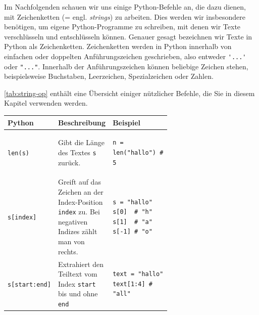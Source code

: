 Im Nachfolgenden schauen wir uns einige Python-Befehle an, die dazu dienen, mit Zeichenketten (= engl. \textit{strings}) zu arbeiten. Dies werden wir insbesondere benötigen, um eigene Python-Programme zu schreiben, mit denen wir Texte verschlüsseln und entschlüsseln können. Genauer gesagt bezeichnen wir Texte in Python als Zeichenketten. Zeichenketten werden in Python innerhalb von einfachen oder doppelten Anführungszeichen geschrieben, also entweder \lstinline|'...'| oder \lstinline|"..."|. Innerhalb der Anführungszeichen können beliebige Zeichen stehen, beispielsweise Buchstaben, Leerzeichen, Spezialzeichen oder Zahlen.


\cref{tab:string-op} enthält eine Übersicht einiger nützlicher Befehle, die Sie in diesem Kapitel verwenden werden.

\begin{table}[H]
    \centering
    \begin{longtable}{lm{0.28\linewidth}m{0.36\linewidth}}
        \textbf{Python}                    & \textbf{Beschreibung}                                                                                                                          & \textbf{Beispiel}                                                 \\\midrule
        \lstinline|len(s)|                 & Gibt die Länge des Textes \lstinline|s| zurück.                                                                                                & \begin{lstlisting}[numbers=none]
n = len("hallo") # 5
\end{lstlisting}                                   \\\midrule
        \lstinline|s[index]|               & Greift auf das Zeichen an der Index-Position \lstinline|index| zu. Bei negativen Indizes zählt man von rechts.                                 & \begin{lstlisting}[numbers=none]
s = "hallo"
s[0]  # "h"
s[1]  # "a"
s[-1] # "o"
\end{lstlisting}                                   \\\midrule
        \lstinline|s[start:end]|           & Extrahiert den Teiltext vom Index \lstinline|start| bis und ohne \lstinline|end|                                                               & \begin{lstlisting}
text = "hallo"
text[1:4] # "all"
\end{lstlisting}                                                 \\\midrule

\end{longtable}
\end{table}
